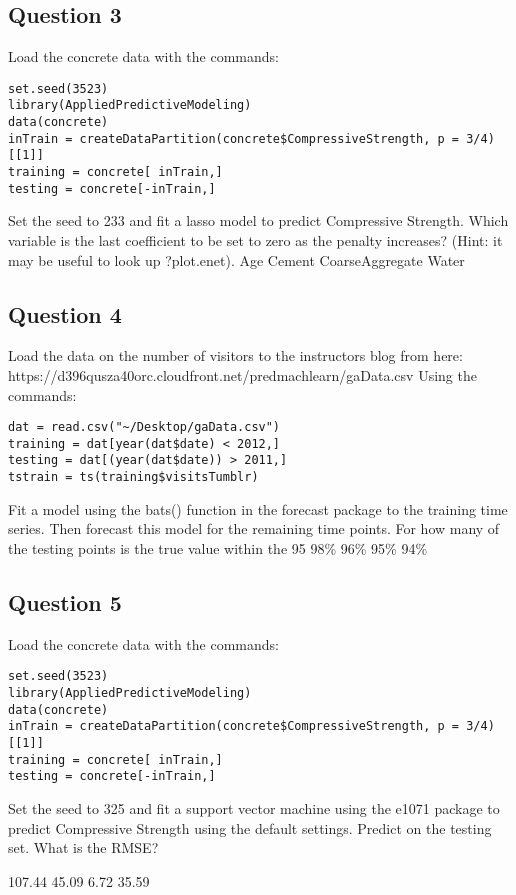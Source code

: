 \subsection{Question 3}
Load the concrete data with the commands:
\begin{framed}
\begin{verbatim}
set.seed(3523)
library(AppliedPredictiveModeling)
data(concrete)
inTrain = createDataPartition(concrete$CompressiveStrength, p = 3/4)[[1]]
training = concrete[ inTrain,]
testing = concrete[-inTrain,]
\end{verbatim}
\end{framed}
Set the seed to 233 and fit a lasso model to predict Compressive Strength. Which variable is the last coefficient to be set to zero as the penalty increases? (Hint: it may be useful to look up ?plot.enet).
Age
Cement
CoarseAggregate
Water
\subsection{Question 4}
Load the data on the number of visitors to the instructors blog from here: 
https://d396qusza40orc.cloudfront.net/predmachlearn/gaData.csv Using the commands:
\begin{framed}
\begin{verbatim} 
dat = read.csv("~/Desktop/gaData.csv")
training = dat[year(dat$date) < 2012,]
testing = dat[(year(dat$date)) > 2011,]
tstrain = ts(training$visitsTumblr)
\end{verbatim}
\end{framed}
Fit a model using the bats() function in the forecast package to the training time series. Then forecast this model for the remaining time points. For how many of the testing points is the true value within the 95%
98\%
96\%
95\%
94\%
\subsection{Question 5}
Load the concrete data with the commands:
\begin{framed}
\begin{verbatim} 
set.seed(3523)
library(AppliedPredictiveModeling)
data(concrete)
inTrain = createDataPartition(concrete$CompressiveStrength, p = 3/4)[[1]]
training = concrete[ inTrain,]
testing = concrete[-inTrain,]
\end{verbatim}
\end{framed}

Set the seed to 325 and fit a support vector machine using the e1071 package to predict Compressive Strength using the default settings. Predict on the testing set. What is the RMSE?

107.44
45.09
6.72
35.59
